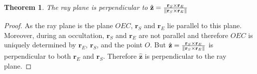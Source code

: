 \documentclass{article}
\theoremstyle{mystyle}
\newtheorem{theorem}{Theorem}[section]
\begin{document}
\begin{theorem}
\label{theorem:ray_plane_perp_to_r_e_cross_r_s}
The ray plane is perpendicular to $\hat{\mathbf{z}} = \frac{\mathbf{r}_{S}\times \mathbf{r}_{E}}{\norm{\mathbf{r}_{S}\times \mathbf{r}_{E}}}$
\end{theorem}
\begin{proof}
As the ray plane is the plane $OEC$, $\mathbf{r}_{S}$ and $\mathbf{r}_{E}$ lie parallel to this plane. Moreover, during an occultation, $\mathbf{r}_{S}$ and $\mathbf{r}_{E}$ are not parallel and therefore $OEC$ is uniquely determined by $\mathbf{r}_{E}$, $\mathbf{r}_{S}$, and the point $O$. But $\hat{\mathbf{z}} = \frac{\mathbf{r}_{S}\times \mathbf{r}_{E}}{\norm{\mathbf{r}_{S}\times \mathbf{r}_{E}}}$ is perpendicular to both $\mathbf{r}_{E}$ and $\mathbf{r}_{S}$. Therefore $\hat{\mathbf{z}}$ is perpendicular to the ray plane.
\end{proof}
\end{document}
